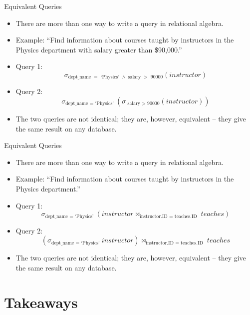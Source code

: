 \documentclass{beamer}
\begin{document}
\begin{frame}{Equivalent Queries}
    \begin{itemize}
        \item There are more than one way to write a query in relational algebra.
        \item Example: ``Find information about courses taught by instructors in the Physics department with salary greater than \$90,000.''
        \item Query 1: 
            $$
                \sigma_{\text{dept\_name } = \text{ `Physics' } \wedge \text{ salary } > \text{ 90000} } (instructor)
            $$
        \item Query 2: 
            $$
                \sigma_{\text{dept\_name } = \text{ `Physics' }} ( \sigma_{ \text{ salary } > \text{ 90000} } (instructor) )
            $$
        \item The two queries are not identical; they are, however, equivalent -- they give the same result on any database.
    \end{itemize}
\end{frame}

\begin{frame}{Equivalent Queries}
    \begin{itemize}
        \item There are more than one way to write a query in relational algebra.
        \item Example: ``Find information about courses taught by instructors in the Physics department.''
        \item Query 1: 
            $$
                \sigma_{\text{dept\_name } = \text{ `Physics' }} (instructor \Join_{\text{instructor.ID } = \text{ teaches.ID }} teaches )
            $$
        \item Query 2: 
            $$
                (\sigma_{\text{dept\_name } = \text{ `Physics' }} instructor) \Join_{\text{instructor.ID } = \text{ teaches.ID }} teaches 
            $$
        \item The two queries are not identical; they are, however, equivalent -- they give the same result on any database.
    \end{itemize}
\end{frame}



\begin{frame}{}
\end{frame}

\section*{Takeaways}
\end{document}
